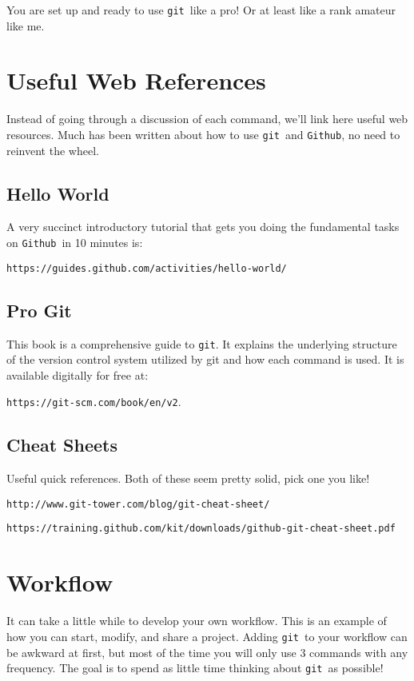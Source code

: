 \documentclass[14pt]{amsart}
\newcommand{\git}{{\texttt{git}}}
\newcommand{\github}{{\texttt{Github}}}
\begin{document}
You are set up and ready to use \git\ like a pro!  Or at least like a rank amateur like me.

\section{Useful Web References}

Instead of going through a discussion of each command, we'll link here useful web resources. Much has been written about how to use \git\ and \github, no need to reinvent the wheel.

\subsection{Hello World}

A very succinct introductory tutorial that gets you doing the fundamental tasks on \github\ in 10 minutes is: 

\texttt{https://guides.github.com/activities/hello-world/}

\subsection{Pro Git}

This book is a comprehensive guide to \git.  It explains the underlying structure of the version control system utilized by git and how each command is used.  It is available digitally for free at: 

\texttt{https://git-scm.com/book/en/v2}.

\subsection{Cheat Sheets}

Useful quick references. Both of these seem pretty solid, pick one you like!

\texttt{http://www.git-tower.com/blog/git-cheat-sheet/}

\texttt{https://training.github.com/kit/downloads/github-git-cheat-sheet.pdf}


\section{Workflow}

It can take a little while to develop your own workflow.  This is an example of how you can start, modify, and share a project.  Adding \git\ to your workflow can be awkward at first, but most of the time you will only use 3 commands with any frequency.  The goal is to spend as little time thinking about \git\ as possible!  
\end{document}
